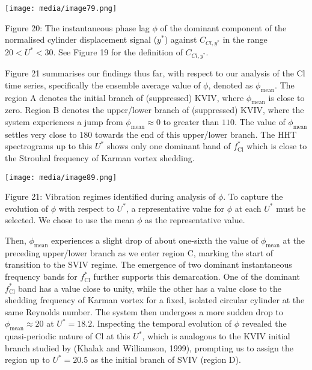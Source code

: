 \documentclass[]{article}
\begin{document}
\texttt{[image: media/image79.png]}

\protect\hypertarget{_Toc41048843}{}{}Figure 20: The instantaneous phase
lag \(\phi\) of the dominant component of the normalised cylinder
displacement signal (\(y^{*}\)) against \(C_{Cl,y^{*}}\) in the range
\(20 < U^{*} < 30\). See Figure 19 for the definition of
\(C_{Cl,y^{*}}\).

Figure 21 summarises our findings thus far, with respect to our analysis
of the Cl time series, specifically the ensemble average value of
\(\phi\), denoted as \(\phi_{\text{mean}}\). The region A denotes the
initial branch of (suppressed) KVIV, where \(\phi_{\text{mean}}\) is
close to zero. Region B denotes the upper/lower branch of (suppressed)
KVIV, where the system experiences a jump from
\(\phi_{\text{mean}} \approx 0\) to greater than \(110\). The value of
\(\phi_{\text{mean}}\) settles very close to \(180\) towards the end of
this upper/lower branch. The HHT spectrograms up to this \(U^{*}\) shows
only one dominant band of \(f_{\text{Cl}}^{*}\) which is close to the
Strouhal frequency of Karman vortex shedding.

\texttt{[image: media/image89.png]}

\protect\hypertarget{_Ref41048465}{}{\protect\hypertarget{_Toc41048844}{}{}}Figure
21: Vibration regimes identified during analysis of \(\phi\). To capture
the evolution of \(\phi\) with respect to \(U^{*}\), a representative
value for \(\phi\) at each \(U^{*}\) must be selected. We chose to use
the mean \(\phi\) as the representative value.

Then, \(\phi_{\text{mean}}\) experiences a slight drop of about
one-sixth the value of \(\phi_{\text{mean}}\) at the preceding
upper/lower branch as we enter region C, marking the start of transition
to the SVIV regime. The emergence of two dominant instantaneous
frequency bands for \(f_{\text{Cl}}^{*}\) further supports this
demarcation. One of the dominant \(f_{\text{Cl}}^{*}\) band has a value
close to unity, while the other has a value close to the shedding
frequency of Karman vortex for a fixed, isolated circular cylinder at
the same Reynolds number. The system then undergoes a more sudden drop
to \(\phi_{\text{mean}} \approx 20\) at \(U^{*} = 18.2\). Inspecting the
temporal evolution of \(\phi\) revealed the quasi-periodic nature of Cl
at this \(U^{*}\), which is analogous to the KVIV initial branch studied
by (Khalak and Williamson, 1999), prompting us to assign the region up
to \(U^{*} = 20.5\) as the initial branch of SVIV (region D).
\end{document}
